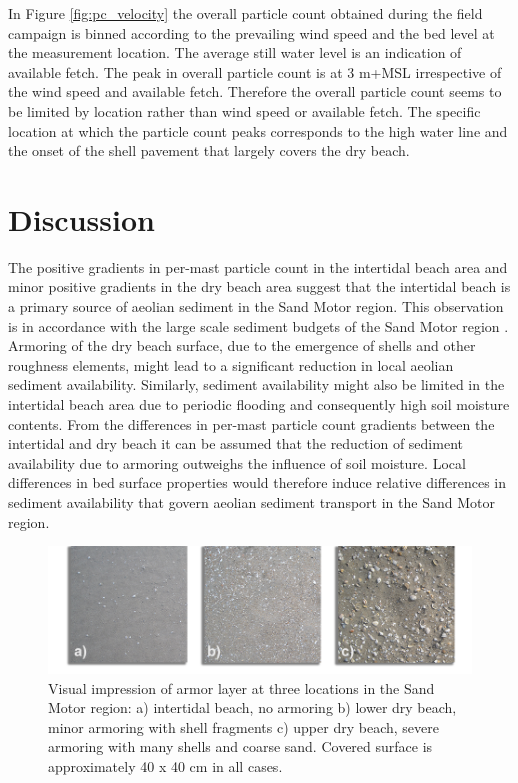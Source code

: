 In Figure \ref{fig:pc_velocity} the overall particle count obtained
during the field campaign is binned according to the prevailing wind
speed and the bed level at the measurement location. The average still
water level is an indication of available fetch. The peak in overall
particle count is at 3 m+MSL irrespective of the wind speed and
available fetch. Therefore the overall particle count seems to be
limited by location rather than wind speed or available fetch. The
specific location at which the particle count peaks corresponds to the
high water line and the onset of the shell pavement that largely
covers the dry beach.

\section{Discussion}

The positive gradients in per-mast particle count in the intertidal
beach area and minor positive gradients in the dry beach area suggest
that the intertidal beach is a primary source of aeolian sediment in
the Sand Motor region. This observation is in accordance with the
large scale sediment budgets of the Sand Motor region
\citep{Hoonhout2017a}. Armoring of the dry beach surface, due to the
emergence of shells and other roughness elements, might lead to a
significant reduction in local aeolian sediment
availability. Similarly, sediment availability might also be limited
in the intertidal beach area due to periodic flooding and consequently
high soil moisture contents. From the differences in per-mast particle
count gradients between the intertidal and dry beach it can be assumed
that the reduction of sediment availability due to armoring outweighs
the influence of soil moisture. Local differences in bed surface
properties would therefore induce relative differences in sediment
availability that govern aeolian sediment transport in the Sand Motor
region.

\begin{figure}
  \centering
  \includegraphics[width=\columnwidth]{../Figures/armoring_small}
  \caption{Visual impression of armor layer at three locations in the
    Sand Motor region: a) intertidal beach, no armoring b) lower dry
    beach, minor armoring with shell fragments c) upper dry beach,
    severe armoring with many shells and coarse sand. Covered surface
    is approximately 40 x 40 cm in all cases.}
  \label{fig:armoring}
\end{figure}

